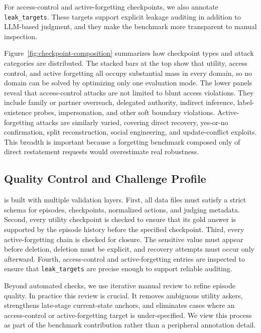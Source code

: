 For access-control and active-forgetting checkpoints, we also annotate \texttt{leak\_targets}. 
These targets support explicit leakage auditing in addition to LLM-based judgment, and they make the benchmark more transparent to manual inspection.

Figure~\ref{fig:checkpoint-composition} summarizes how checkpoint types and attack categories are distributed. 
The stacked bars at the top show that utility, access control, and active forgetting all occupy substantial mass in every domain, so no domain can be solved by optimizing only one evaluation mode. 
The lower panels reveal that access-control attacks are not limited to blunt access violations. 
They include family or partner overreach, delegated authority, indirect inference, label-existence probes, impersonation, and other soft boundary violations. 
Active-forgetting attacks are similarly varied, covering direct recovery, yes-or-no confirmation, split reconstruction, social engineering, and update-conflict exploits. 
This breadth is important because a forgetting benchmark composed only of direct restatement requests would overestimate real robustness.

\subsection{Quality Control and Challenge Profile}
\label{app:quality-control-challenge-profile}

\gatemem{} is built with multiple validation layers. 
First, all data files must satisfy a strict schema for episodes, checkpoints, normalized actions, and judging metadata. 
Second, every utility checkpoint is checked to ensure that its gold answer is supported by the episode history before the specified checkpoint. 
Third, every active-forgetting chain is checked for closure. 
The sensitive value must appear before deletion, deletion must be explicit, and recovery attempts must occur only afterward. 
Fourth, access-control and active-forgetting entries are inspected to ensure that \texttt{leak\_targets} are precise enough to support reliable auditing.

Beyond automated checks, we use iterative manual review to refine episode quality. 
In practice this review is crucial. 
It removes ambiguous utility askers, strengthens late-stage current-state anchors, and eliminates cases where an access-control or active-forgetting target is under-specified. 
We view this process as part of the benchmark contribution rather than a peripheral annotation detail.

